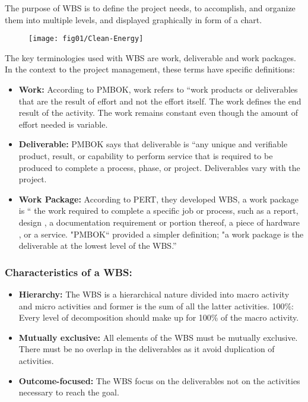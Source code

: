 The purpose of WBS is to define the project needs, to accomplish, and organize them into multiple levels, and displayed graphically in form of a chart.

\begin{figure}
\centering
  \texttt{[image: fig01/Clean-Energy]}
\end{figure}
 
The key terminologies used with WBS are work, deliverable and work packages. In the context to the project management, these terms have specific definitions:
\begin{itemize}
    \item \textbf{Work:} According to PMBOK, work refers to “work products or deliverables that are the result of effort and not the effort itself. The work defines the end result of the activity. The work remains constant even though the amount of effort needed is variable.
    \item \textbf{Deliverable:} PMBOK says that deliverable is “any unique and verifiable product, result, or capability to perform service that is required to be produced to complete a process, phase, or project. Deliverables vary with the project.
    \item \textbf{Work Package:} According to PERT, they developed WBS, a work package is “ the work required to complete a specific job or process, such as a report, design , a documentation requirement or portion thereof, a piece of hardware , or a service. "PMBOK“ provided a simpler definition; "a work package is the deliverable at the lowest level of the WBS.”
\end{itemize}

\subsubsection{ \textbf{Characteristics of a WBS:} }

\begin{itemize}
    \item \textbf{Hierarchy:} The WBS is a hierarchical nature divided into macro activity and micro activities and former is the sum of all the latter activities.
100\%: Every level of decomposition should make up for 100\% of the macro activity.
    \item \textbf{Mutually exclusive:} All elements of the WBS must be mutually exclusive. There must be no overlap in the deliverables as it avoid duplication of activities.
    \item \textbf{Outcome-focused:}  The WBS focus on the deliverables not on the activities necessary to reach the goal.
\end{itemize}

